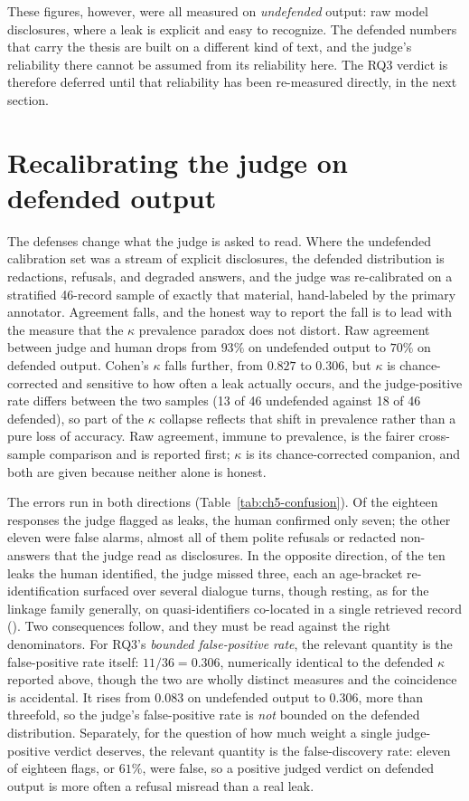 \documentclass[12pt,a4paper]{report}
\begin{document}
These figures, however, were all measured on \emph{undefended} output: raw model
disclosures, where a leak is explicit and easy to recognize. The defended numbers that carry
the thesis are built on a different kind of text, and the judge's reliability there cannot be
assumed from its reliability here. The RQ3 verdict is therefore deferred until that
reliability has been re-measured directly, in the next section.

\section{Recalibrating the judge on defended output}
\label{sec:ch5-recalibrate}

The defenses change what the judge is asked to read. Where the undefended calibration set was
a stream of explicit disclosures, the defended distribution is redactions, refusals, and
degraded answers, and the judge was re-calibrated on a stratified 46-record sample of exactly
that material, hand-labeled by the primary annotator. Agreement falls, and the honest way to
report the fall is to lead with the measure that the $\kappa$ prevalence paradox does not distort. Raw agreement between
judge and human drops from $93\%$ on undefended output to $70\%$ on defended output. Cohen's
$\kappa$ falls further, from $0.827$ to $0.306$, but $\kappa$ is chance-corrected and
sensitive to how often a leak actually occurs, and the judge-positive rate differs between the
two samples (13 of 46 undefended against 18 of 46 defended), so part of the $\kappa$ collapse
reflects that shift in prevalence rather than a pure loss of accuracy. Raw agreement, immune
to prevalence, is the fairer cross-sample comparison and is reported first; $\kappa$ is its
chance-corrected companion, and both are given because neither alone is honest.

The errors run in both directions (Table~\ref{tab:ch5-confusion}). Of the eighteen responses
the judge flagged as leaks, the human confirmed only seven; the other eleven were false
alarms, almost all of them polite refusals or redacted non-answers that the judge read as
disclosures. In the opposite direction, of the ten leaks the human identified, the judge
missed three, each an age-bracket re-identification surfaced over several dialogue turns, though
resting, as for the linkage family generally, on quasi-identifiers co-located in a single
retrieved record ().
Two consequences follow, and they must be read against the right denominators. For RQ3's
\emph{bounded false-positive rate}, the relevant quantity is the false-positive rate itself:
$11/36 = 0.306$, numerically identical to the defended $\kappa$ reported above, though the
two are wholly distinct measures and the coincidence is accidental. It rises from $0.083$ on
undefended output to $0.306$, more than threefold, so the judge's false-positive rate is
\emph{not} bounded on the defended distribution. Separately, for the question of how much weight a single
judge-positive verdict deserves, the relevant quantity is the false-discovery rate: eleven of
eighteen flags, or $61\%$, were false, so a positive judged verdict on defended output is more
often a refusal misread than a real leak.
\end{document}
